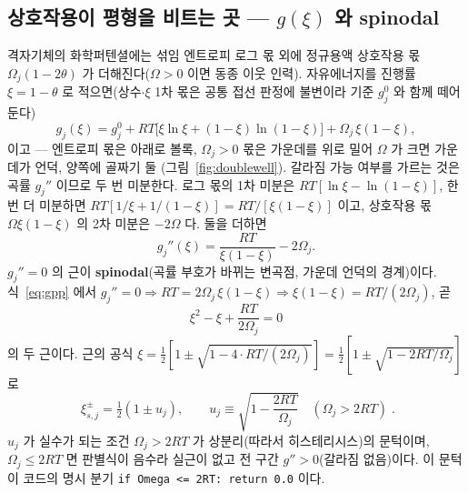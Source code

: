 \documentclass[11pt,a4paper]{article}
\newcommand{\code}[1]{\texttt{#1}}
\begin{document}
\subsection{상호작용이 평형을 비트는 곳 — $g(\xi)$ 와 spinodal}
격자기체의 화학퍼텐셜에는 섞임 엔트로피 로그 몫 외에 정규용액 상호작용 몫 $\Omega_j(1-2\theta)$ 가 더해진다($\Omega>0$
이면 동종 이웃 인력). 자유에너지를 진행률 $\xi=1-\theta$ 로 적으면(상수$\cdot$$\xi$ 1차 몫은 공통 접선 판정에 불변이라
기준 $g_j^0$ 와 함께 떼어 둔다)
\begin{equation}
g_j(\xi)=g_j^0+RT\big[\xi\ln\xi+(1-\xi)\ln(1-\xi)\big]+\Omega_j\,\xi(1-\xi),
\label{eq:gxi}
\end{equation}
이고 — 엔트로피 몫은 아래로 볼록, $\Omega_j>0$ 몫은 가운데를 위로 밀어 $\Omega$ 가 크면 가운데가 언덕, 양쪽에 골짜기 둘
(그림~\ref{fig:doublewell}). 갈라짐 가능 여부를 가르는 것은 곡률 $g_j''$ 이므로 두 번 미분한다. 로그 몫의 1차 미분은
$RT[\ln\xi-\ln(1-\xi)]$, 한 번 더 미분하면 $RT[1/\xi+1/(1-\xi)]=RT/[\xi(1-\xi)]$ 이고, 상호작용 몫 $\Omega\xi(1-\xi)$
의 2차 미분은 $-2\Omega$ 다. 둘을 더하면
\begin{equation}
g_j''(\xi)=\frac{RT}{\xi(1-\xi)}-2\Omega_j.
\label{eq:gpp}
\end{equation}
$g_j''=0$ 의 근이 \textbf{spinodal}(곡률 부호가 바뀌는 변곡점, 가운데 언덕의 경계)이다. 식~\eqref{eq:gpp} 에서
$g_j''=0\Rightarrow RT=2\Omega_j\,\xi(1-\xi)\Rightarrow\xi(1-\xi)=RT/(2\Omega_j)$, 곧
\begin{equation}
\xi^2-\xi+\frac{RT}{2\Omega_j}=0
\label{eq:spinquad}
\end{equation}
의 두 근이다. 근의 공식 $\xi=\tfrac12[1\pm\sqrt{1-4\cdot RT/(2\Omega_j)}]=\tfrac12[1\pm\sqrt{1-2RT/\Omega_j}]$ 로
\begin{equation}
\boxed{\;\xi_{s,j}^\pm=\tfrac12(1\pm u_j),\qquad
u_j\equiv\sqrt{1-\frac{2RT}{\Omega_j}}\quad(\Omega_j>2RT)\;.}
\label{eq:spinodal}
\end{equation}
$u_j$ 가 실수가 되는 조건 $\Omega_j>2RT$ 가 상분리(따라서 히스테리시스)의 문턱이며, $\Omega_j\le2RT$ 면 판별식이
음수라 실근이 없고 전 구간 $g''>0$(갈라짐 없음)이다. 이 문턱이 코드의 명시 분기 \code{if Omega <= 2RT: return 0.0} 이다.
\end{document}
